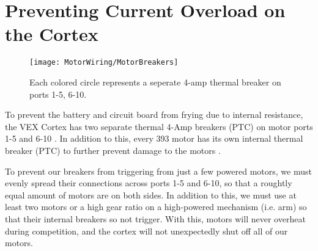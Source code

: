 \section{Preventing Current Overload on the Cortex}

\begin{figure}[h]
    \centering
    \texttt{[image: MotorWiring/MotorBreakers]}
    \caption{
        Each colored circle represents a seperate 4-amp thermal breaker on ports 1-5, 6-10.
    }
\end{figure}

To prevent the battery and circuit board from frying due to internal resistance, the VEX Cortex has two separate thermal 4-Amp breakers (PTC) on motor ports 1-5 and 6-10 \cite{CortexBreakers}. In addition to this, every 393 motor has its own internal thermal breaker (PTC) to further prevent damage to the motors \cite{MotorBreakers}.

To prevent our breakers from triggering from just a few powered motors, we must evenly spread their connections across ports 1-5 and 6-10, so that a roughtly equal amount of motors are on both sides. In addition to this, we must use at least two motors or a high gear ratio on a high-powered mechanism (i.e. arm) so that their internal breakers so not trigger. With this, motors will never overheat during competition, and the cortex will not unexpectedly shut off all of our motors.
